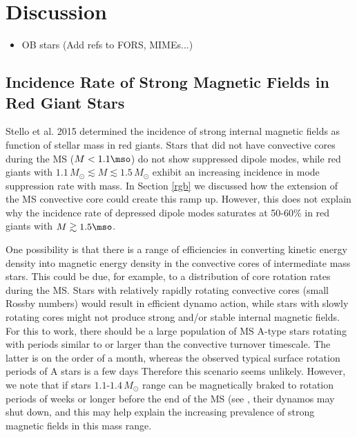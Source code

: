 \section{Discussion}
\begin{itemize}
\item OB stars (Add refs to FORS, MIMEs...)
\end{itemize}

\subsection{Incidence Rate of Strong Magnetic Fields in Red Giant Stars}
Stello et al. 2015 determined the incidence of strong internal magnetic fields as function of stellar mass in red giants. Stars that did not have convective cores during the MS ($M<1.1\mso$) do not show suppressed dipole modes, while red giants with $1.1 \, M_\odot \lesssim M \lesssim 1.5 \, M_\odot$ exhibit an increasing incidence in mode suppression rate with mass. In Section \ref{rgb} we discussed how the extension of the MS convective core could create this ramp up. However, this does not explain why the incidence rate of depressed dipole modes saturates at 50-60\% in red giants with $M \gtrsim 1.5 \mso$.

One possibility is that there is a range of efficiencies in converting kinetic energy density into magnetic energy density in the convective cores of intermediate mass stars. This could be due, for example, to a distribution of core rotation rates during the MS. Stars with relatively rapidly rotating convective cores (small Rossby numbers) would result in efficient dynamo action, while stars with slowly rotating cores might not produce strong and/or stable internal magnetic fields. For this to work, there should be a large population of MS A-type stars rotating with periods similar to or larger than the convective turnover timescale. The latter is on the order of a month, whereas the observed typical surface rotation periods of A stars is a few days \citep{Zorec_2012}
Therefore this scenario seems unlikely. However, we note that if stars $1.1$-$1.4 \, M_\odot$ range can be magnetically braked to rotation periods of weeks or longer before the end of the MS (see \cite{VanSaders_2013}, their dynamos may shut down, and this may help explain the increasing prevalence of strong magnetic fields in this mass range.

